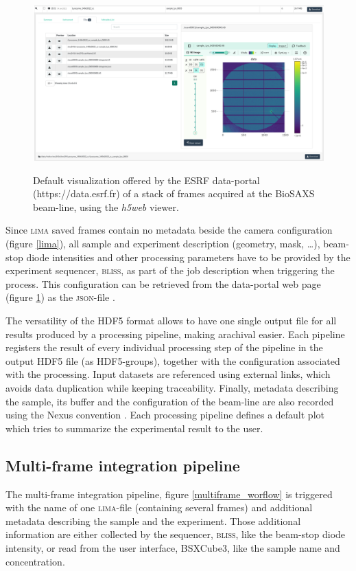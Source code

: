 \documentclass[preprint]{iucr}              %
\begin{document}
\begin{figure}
     \caption{Default visualization offered by the ESRF data-portal (https://data.esrf.fr) of a stack of frames acquired at the BioSAXS beam-line, using the \textit{h5web} viewer.}
     \includegraphics[width=12cm]{dataportal.eps}
     \label{dataportal}
\end{figure}

Since \textsc{lima} saved frames contain no metadata beside the camera configuration (figure \ref{lima}), all sample and experiment description (geometry, mask, \ldots), beam-stop diode intensities and other processing parameters have to be provided by the experiment sequencer, \textsc{bliss}, as part of the job description when triggering the process. 
This configuration can be retrieved from the data-portal web page (figure \ref{dataportal}) as the \textsc{json}-file \cite{json}.

The versatility of the HDF5 format allows to have one single output file for all results produced by a processing pipeline, making arachival easier.
Each pipeline registers the result of every individual processing step of the pipeline in the output HDF5 file (as HDF5-groups), together with the configuration associated with the processing.
Input datasets are referenced using external links, which avoids data duplication while keeping traceability. 
Finally, metadata describing the sample, its buffer and the configuration of the beam-line are also recorded using the Nexus convention \cite{nexus}.
Each processing pipeline defines a default plot which tries to summarize the experimental result to the user.

\subsection{Multi-frame integration pipeline}
\label{multiframe_pipeline}
The multi-frame integration pipeline, figure \ref{multiframe_worflow} is triggered with the name of one \textsc{lima}-file (containing several frames) and additional metadata describing the sample and the experiment.
Those additional information are either collected by the sequencer, \textsc{bliss}, like the beam-stop diode intensity, or read from the user interface, BSXCube3, like the sample name and concentration.
\end{document}
